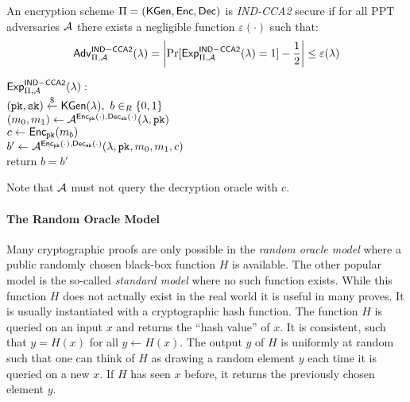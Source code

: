 \begin{definition}\label{def:indcca2}
An encryption scheme $\Pi=(\mathsf{KGen},\mathsf{Enc},\mathsf{Dec})$ is \emph{IND-CCA2} secure if for all \ac{PPT} adversaries $\mathcal{A}$ there exists a negligible function $\varepsilon(\cdot)$ such that:
\[\mathsf{Adv}_{\Pi,\mathcal{A}}^{\mathsf{IND-CCA2}}(\lambda)=\left|\Pr[\mathsf{Exp}^{\mathsf{IND-CCA2}}_{\Pi,\mathcal{A}}(\lambda)=1]-\frac12\right|\leq\varepsilon(\lambda)\]

\noindent
$\mathsf{Exp}^{\mathsf{IND-CCA2}}_{\Pi,\mathcal{A}}(\lambda):$\\
\hspace*{2em}$(\mathtt{pk},\mathtt{sk})\stackrel{\$}{\gets}\mathsf{KGen}(\lambda),~b\in_R\{0,1\}$\\
\hspace*{2em}$(m_0,m_1)\gets\mathcal{A}^{\mathsf{Enc}_\mathtt{pk}(\cdot),\mathsf{Dec}_\mathtt{sk}(\cdot)}(\lambda,\mathtt{pk})$\\
\hspace*{2em}$c\gets\mathsf{Enc}_\mathtt{pk}(m_b)$\\
\hspace*{2em}$b'\gets\mathcal{A}^{\mathsf{Enc}_\mathtt{pk}(\cdot),\mathsf{Dec}_\mathtt{sk}(\cdot)}(\lambda,\mathtt{pk},m_0,m_1,c)$\\
\hspace*{2em}return $b=b'$
\eod
\end{definition}

\noindent
Note that $\mathcal{A}$ must not query the decryption oracle with $c$.

\paragraph{The Random Oracle Model}
Many cryptographic proofs are only possible in the \emph{random oracle model} where a public randomly chosen black-box function $H$ is available.
The other popular model is the so-called \emph{standard model} where no such function exists.
While this function $H$ does not actually exist in the real world it is useful in many proves.
It is usually instantiated with a cryptographic hash function.
The function $H$ is queried on an input $x$ and returns the ``hash value'' of $x$.
It is consistent, such that $y=H(x)$ for all $y\gets H(x)$.
The output $y$ of $H$ is uniformly at random such that one can think of $H$ as drawing a random element $y$ each time it is queried on a new $x$.
If $H$ has seen $x$ before, it returns the previously chosen element $y$.

